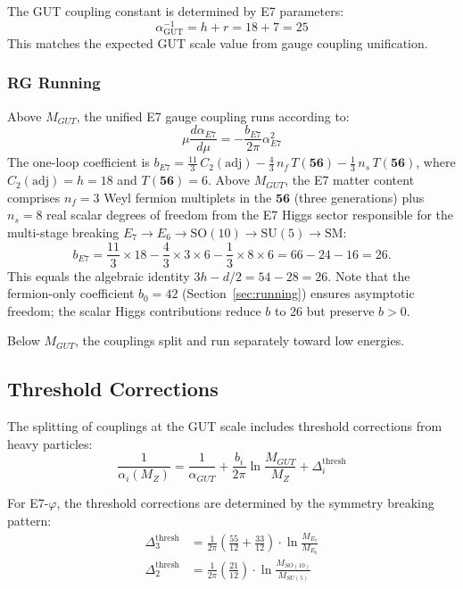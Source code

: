 \documentclass[11pt,a4paper]{article}
\begin{document}
The GUT coupling constant is determined by E7 parameters:
\begin{equation}
\boxed{\alpha_{\text{GUT}}^{-1} = h + r = 18 + 7 = 25}
\end{equation}
This matches the expected GUT scale value from gauge coupling unification.

\subsubsection{RG Running}

Above $M_{GUT}$, the unified E7 gauge coupling runs according to:
\begin{equation}
\mu \frac{d\alpha_{E7}}{d\mu} = -\frac{b_{E7}}{2\pi} \alpha_{E7}^2
\end{equation}
The one-loop coefficient is $b_{E7} = \tfrac{11}{3}\,C_2(\mathrm{adj}) - \tfrac{4}{3}\,n_f\,T(\mathbf{56}) - \tfrac{1}{3}\,n_s\,T(\mathbf{56})$, where $C_2(\mathrm{adj}) = h = 18$ and $T(\mathbf{56}) = 6$. Above $M_{GUT}$, the E7 matter content comprises $n_f = 3$ Weyl fermion multiplets in the $\mathbf{56}$ (three generations) plus $n_s = 8$ real scalar degrees of freedom from the E7 Higgs sector responsible for the multi-stage breaking $E_7 \to E_6 \to \mathrm{SO}(10) \to \mathrm{SU}(5) \to \mathrm{SM}$:
\begin{equation}
b_{E7} = \frac{11}{3} \times 18 - \frac{4}{3} \times 3 \times 6 - \frac{1}{3} \times 8 \times 6 = 66 - 24 - 16 = 26.
\end{equation}
This equals the algebraic identity $3h - d/2 = 54 - 28 = 26$. Note that the fermion-only coefficient $b_0 = 42$ (Section~\ref{sec:running}) ensures asymptotic freedom; the scalar Higgs contributions reduce $b$ to 26 but preserve $b > 0$.

Below $M_{GUT}$, the couplings split and run separately toward low energies.

\subsection{Threshold Corrections}

The splitting of couplings at the GUT scale includes threshold corrections from heavy particles:
\begin{equation}
\frac{1}{\alpha_i(M_Z)} = \frac{1}{\alpha_{GUT}} + \frac{b_i}{2\pi}\ln\frac{M_{GUT}}{M_Z} + \Delta_i^{\text{thresh}}
\end{equation}

For E7-$\varphi$, the threshold corrections are determined by the symmetry breaking pattern:
\begin{align}
\Delta_3^{\text{thresh}} &= \frac{1}{2\pi}\left(\frac{55}{12} + \frac{33}{12}\right) \cdot \ln\frac{M_{E_7}}{M_{E_6}} \\
\Delta_2^{\text{thresh}} &= \frac{1}{2\pi}\left(\frac{21}{12}\right) \cdot \ln\frac{M_{SO(10)}}{M_{SU(5)}}
\end{align}
\end{document}
